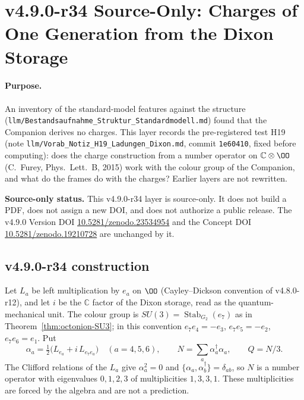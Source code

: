 \clearpage
\section*{v4.9.0-r34 Source-Only: Charges of One Generation from the Dixon Storage}
\label{sec:v490-r34-charges-dixon}

\paragraph{Purpose.}
An inventory of the standard-model features against the structure (\texttt{llm/Bestandsaufnahme\_Struktur\_Standardmodell.md})
found that the Companion derives no charges.  This layer records the pre-registered test H19 (note
\texttt{llm/Vorab\_Notiz\_H19\_Ladungen\_Dixon.md}, commit \texttt{1e60410}, fixed before computing): does the charge
construction from a number operator on \(\mathbb C\otimes\OO\) (C.~Furey, Phys.\ Lett.\ B, 2015) work with the colour group
of the Companion, and what do the frames do with the charges?  Earlier layers are not rewritten.

\noindent\textbf{Source-only status.}
This v4.9.0-r34 layer is source-only.  It does not build a PDF, does not assign a new DOI,
and does not authorize a public release.  The v4.9.0 Version DOI
\href{https://doi.org/10.5281/zenodo.23534954}{10.5281/zenodo.23534954} and the Concept DOI
\href{https://doi.org/10.5281/zenodo.19210728}{10.5281/zenodo.19210728} are unchanged by it.

\subsection*{v4.9.0-r34 construction}
\label{subsec:v490-r34-construction}

Let \(L_a\) be left multiplication by \(e_a\) on \(\OO\) (Cayley--Dickson convention of v4.8.0-r12), and let \(i\) be the
\(\mathbb C\) factor of the Dixon storage, read as the quantum-mechanical unit.  The colour group is
\(SU(3)=\operatorname{Stab}_{G_2}(e_7)\) as in Theorem~\ref{thm:octonion-SU3}; in this convention \(e_7e_4=-e_3\),
\(e_7e_5=-e_2\), \(e_7e_6=e_1\).  Put
\[
\alpha_a=\tfrac12\bigl(L_{e_a}+i\,L_{e_7e_a}\bigr)\quad(a=4,5,6),\qquad N=\sum_a\alpha_a^\dagger\alpha_a,\qquad Q=N/3 .
\]
The Clifford relations of the \(L_a\) give \(\alpha_a^2=0\) and \(\{\alpha_a,\alpha_b^\dagger\}=\delta_{ab}\), so \(N\) is a
number operator with eigenvalues \(0,1,2,3\) of multiplicities \(1,3,3,1\).  These multiplicities are forced by the algebra
and are not a prediction.

